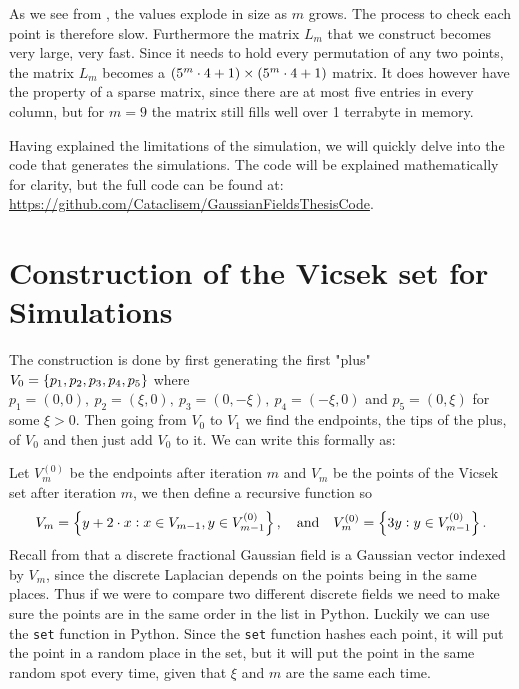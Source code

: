 As we see from , the values explode in size as $m$ grows. The process to check each point is therefore slow. Furthermore the matrix $L_m$ that we construct becomes very large, very fast. Since it needs to hold every permutation of any two points, the matrix $L_m$ becomes a $\left(5^{m}\cdot 4 + 1\right) \times \left(5^{m}\cdot 4 + 1\right)$ matrix. It does however have the property of a sparse matrix, since there are at most five entries in every column, but for $m= 9$ the matrix still fills well over 1 terrabyte in memory.

Having explained the limitations of the simulation, we will quickly delve into the code that generates the simulations. The code will be explained mathematically for clarity, but the full code can be found at: \\ \url{https://github.com/Cataclisem/GaussianFieldsThesisCode}.

\section[Construction of the Vicsek set for Simulations]{Construction of the Vicsek set for Simulations}
The construction is done by first generating the first "plus" $V_0 = \cbr{ p_1, p_2, p_3, p_4, p_5}$ where $p_1 = (0,0), \ p_2=(\xi, 0), \ p_3 = (0, -\xi), \ p_4 = (-\xi, 0)$ and $p_5 = (0, \xi)$ for some $\xi > 0$. Then going from $V_0$ to $V_1$ we find the endpoints, the tips of the plus, of $V_0$ and then just add $V_0$ to it. We can write this formally as:

Let $V^{(0)}_{m}$ be the endpoints after iteration $m$ and $V_m$ be the points of the Vicsek set after iteration $m$, we then define a recursive function so
\begin{equation}
	V_m = \cbr{y + 2\cdot x : x \in V_{m-1}, y \in V^{(0)}_{m-1}}, \quad \text{and} \quad V^{(0)}_m = \cbr{3y : y \in V^{(0)}_{m-1}}.
\end{equation}
Recall from  that a discrete fractional Gaussian field is a Gaussian vector indexed by $V_m$, since the discrete Laplacian depends on the points being in the same places. Thus if we were to compare two different discrete fields we need to make sure the points are in the same order in the list in Python. Luckily we can use the \verb*|set| function in Python. Since the \verb*|set| function hashes each point, it will put the point in a random place in the set, but it will put the point in the same random spot every time, given that $\xi$ and $m$ are the same each time. 

